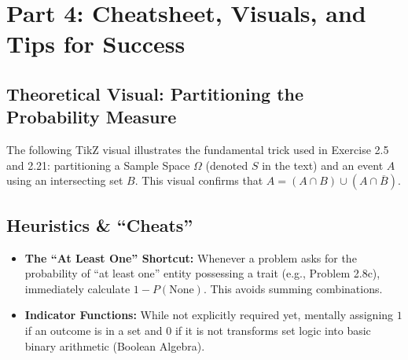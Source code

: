 \documentclass[12pt]{article}
\begin{document}
\newpage
\section{Part 4: Cheatsheet, Visuals, and Tips for Success}

\subsection{Theoretical Visual: Partitioning the Probability Measure}
The following TikZ visual illustrates the fundamental trick used in Exercise 2.5 and 2.21: partitioning a Sample Space $\Omega$ (denoted $S$ in the text) and an event $A$ using an intersecting set $B$. This visual confirms that $A = (A \cap B) \cup (A \cap \overline{B})$.

\vspace{0.5cm}
\begin{center}
\end{center}
\vspace{0.5cm}

\subsection{Heuristics \& ``Cheats''}
\begin{itemize}
    \item \textbf{The ``At Least One'' Shortcut:} Whenever a problem asks for the probability of ``at least one'' entity possessing a trait (e.g., Problem 2.8c), immediately calculate $1 - P(\text{None})$. This avoids summing combinations. 
    \item \textbf{Indicator Functions:} While not explicitly required yet, mentally assigning $1$ if an outcome is in a set and $0$ if it is not transforms set logic into basic binary arithmetic (Boolean Algebra). 
\end{itemize}
\end{document}
